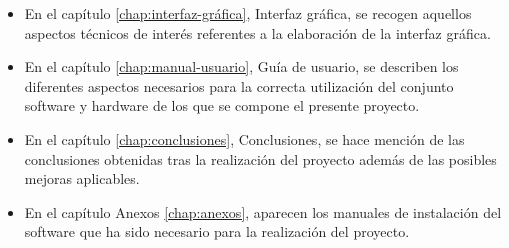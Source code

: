 \begin{itemize}
\item En el capítulo \ref{chap:interfaz-gráfica}, Interfaz gráfica, se recogen aquellos aspectos técnicos de interés referentes a la elaboración de la interfaz gráfica.

\item En el capítulo \ref{chap:manual-usuario}, Guía de usuario, se describen los diferentes aspectos necesarios para la correcta utilización del conjunto software y hardware de los que se compone el presente proyecto.

\item En el capítulo \ref{chap:conclusiones}, Conclusiones, se hace mención de las conclusiones obtenidas tras la realización del proyecto además de las posibles mejoras aplicables.

\item En el capítulo Anexos \ref{chap:anexos}, aparecen los manuales de instalación del software que ha sido necesario para la realización del proyecto.

\end{itemize}
